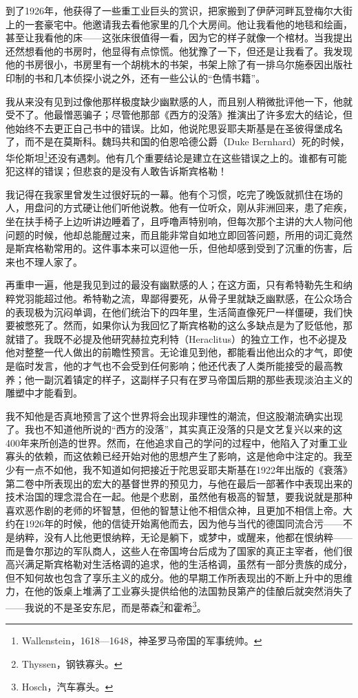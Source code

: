 \documentclass[UTF8]{ctexart}
\begin{document}
到了1926年，他获得了一些重工业巨头的赏识，把家搬到了伊萨河畔瓦登梅尔大街上的一套豪宅中。他邀请我去看他家里的几个大房间。他让我看他的地毯和绘画，甚至让我看他的床——这张床很值得一看，因为它的样子就像一个棺材。当我提出还然想看他的书房时，他显得有点惊慌。他犹豫了一下，但还是让我看了。我发现他的书房很小，书房里有一个胡桃木的书架，书架上除了有一排乌尔施泰因出版社印制的书和几本侦探小说之外，还有一些公认的“色情书籍”。

我从来没有见到过像他那样极度缺少幽默感的人，而且别人稍微批评他一下，他就受不了。他最憎恶骗子；尽管他那部《西方的没落》推演出了许多宏大的结论，但他始终不去更正自己书中的错误。比如，他说陀思妥耶夫斯基是在圣彼得堡成名了，而不是在莫斯科。魏玛共和国的伯恩哈德公爵（Duke Bernhard）死的时候，华伦斯坦\footnote{Wallenstein，1618—1648，神圣罗马帝国的军事统帅。}还没有遇刺。他有几个重要结论是建立在这些错误之上的。谁都有可能犯这样的错误；但悲哀的是没有人敢告诉斯宾格勒！

我记得在我家里曾发生过很好玩的一幕。他有个习惯，吃完了晚饭就抓住在场的人，用盘问的方式硬让他们听他说教。他有一位听众，刚从非洲回来，患了疟疾，坐在扶手椅子上边听讲边睡着了，且呼噜声特别响，但每次那个主讲的大人物问他问题的时候，他却总能醒过来，而且能非常自如地立即回答问题，所用的词汇竟然是斯宾格勒常用的。这件事本来可以逗他一乐，但他却感到受到了沉重的伤害，后来也不理人家了。

再重申一遍，他是我见到过的最没有幽默感的人；在这方面，只有希特勒先生和纳粹党羽能超过他。希特勒之流，卑鄙得要死，从骨子里就缺乏幽默感，在公众场合的表现极为沉闷单调，在他们统治下的四年里，生活简直像死尸一样僵硬，我们快要被憋死了。然而，如果你认为我回忆了斯宾格勒的这么多缺点是为了贬低他，那就错了。我既不必提及他研究赫拉克利特（Heraclitus）的独立工作，也不必提及他对整整一代人做出的前瞻性预言。无论谁见到他，都能看出他出众的才气，即使是临时发言，他的才气也不会受到任何影响；他还代表了人类所能接受的最高教养；他一副沉着镇定的样子，这副样子只有在罗马帝国后期的那些表现淡泊主义的雕塑中才能看到。

我不知他是否真地预言了这个世界将会出现非理性的潮流，但这股潮流确实出现了。我也不知道他所说的“西方的没落”，其实真正没落的只是文艺复兴以来的这400年来所创造的世界。然而，在他追求自己的学问的过程中，他陷入了对重工业寡头的依赖，而这依赖已经开始对他的思想产生了影响，这是他命中注定的。我至少有一点不如他，我不知道如何把接近于陀思妥耶夫斯基在1922年出版的《衰落》第二卷中所表现出的宏大的基督世界的预见力，与他在最后一部著作中表现出来的技术治国的理念混合在一起。他是个悲剧，虽然他有极高的智慧，要我说就是那种喜欢恶作剧的老师的坏智慧，但他的智慧让他不相信众神，且更加不相信上帝。大约在1926年的时候，他的信徒开始离他而去，因为他与当代的德国同流合污——不是纳粹，没有人比他更恨纳粹，无论是躺下，或梦中，或醒来，他都在恨纳粹——而是鲁尔那边的军队商人，这些人在帝国垮台后成为了国家的真正主宰者，他们很高兴满足斯宾格勒对生活格调的追求，他的生活格调，虽然有一部分贵族的成分，但不知何故也包含了享乐主义的成分。他的早期工作所表现出的不断上升中的思维力，在他的饭桌上堆满了工业寡头提供给他的法国勃艮第产的佳酿后就突然消失了——我说的不是圣安东尼，而是蒂森\footnote{Thyssen，钢铁寡头。}和霍希\footnote{Hosch，汽车寡头。}。
\end{document}
